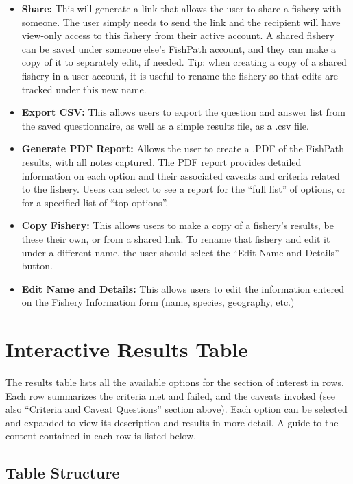 \documentclass[
  11pt,
]{book}
\providecommand{\tightlist}{%
  \setlength{\itemsep}{0pt}\setlength{\parskip}{0pt}}
\begin{document}
\begin{itemize}
\tightlist
\item
  \textbf{Share:} This will generate a link that allows the user to share a fishery with someone. The user simply needs to send the link and the recipient will have view-only access to this fishery from their active account. A shared fishery can be saved under someone else's FishPath account, and they can make a copy of it to separately edit, if needed. Tip: when creating a copy of a shared fishery in a user account, it is useful to rename the fishery so that edits are tracked under this new name.
\item
  \textbf{Export CSV:} This allows users to export the question and answer list from the saved questionnaire, as well as a simple results file, as a .csv file.
\item
  \textbf{Generate PDF Report:} Allows the user to create a .PDF of the FishPath results, with all notes captured. The PDF report provides detailed information on each option and their associated caveats and criteria related to the fishery. Users can select to see a report for the ``full list'' of options, or for a specified list of ``top options''.
\item
  \textbf{Copy Fishery:} This allows users to make a copy of a fishery's results, be these their own, or from a shared link. To rename that fishery and edit it under a different name, the user should select the ``Edit Name and Details'' button.
\item
  \textbf{Edit Name and Details:} This allows users to edit the information entered on the Fishery Information form (name, species, geography, etc.)
\end{itemize}

\hypertarget{interactive-results-table}{%
\section{Interactive Results Table}\label{interactive-results-table}}

The results table lists all the available options for the section of interest in rows. Each row summarizes the criteria met and failed, and the caveats invoked (see also ``Criteria and Caveat Questions'' section above). Each option can be selected and expanded to view its description and results in more detail. A guide to the content contained in each row is listed below.

\hypertarget{table-structure}{%
\subsection{Table Structure}\label{table-structure}}
\end{document}
